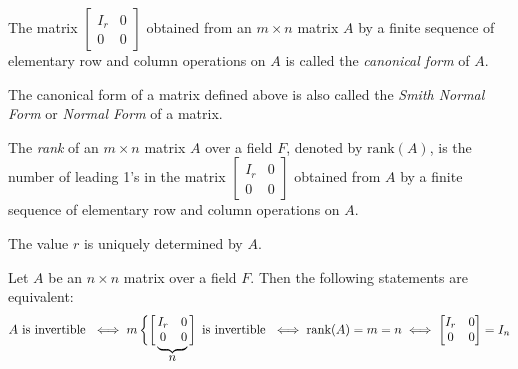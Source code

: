 \documentclass[
	11pt, %
	fleqn, %
	a4paper, %
]{LegrandOrangeBook}
\begin{document}
\begin{definition}
    The matrix $\begin{bmatrix}
        I_r & 0 \\
        0 & 0
    \end{bmatrix}$ obtained from an $m \times n$ matrix $A$ by a finite sequence of elementary row and column operations on $A$ is called the \emph{canonical form} of $A$.    
\end{definition}

\begin{remark}
    The canonical form of a matrix defined above is also called the \emph{Smith Normal Form} or \emph{Normal Form} of a matrix.
\end{remark}

\begin{definition}
    The \emph{rank} of an $m \times n$ matrix $A$ over a field $F$, denoted by $\text{rank}(A)$, is the number of leading 1's in the matrix $\begin{bmatrix}
        I_r & 0 \\
        0 & 0
    \end{bmatrix}$ obtained from $A$ by a finite sequence of elementary row and column operations on $A$.
\end{definition}

\begin{remark}
    The value $r$ is uniquely determined by $A$.
\end{remark}

\def\matriximg{%
    \begin{matrix}
        I_r & 0 \\
        0 & 0 
    \end{matrix}
}

\begin{proposition}
    Let $A$ be an $n \times n$ matrix over a field $F$. Then the following statements are equivalent:
    \[
        A \text{ is invertible } \iff m \left\{\left[\vphantom{\matriximg}\right.\right.\kern-2\nulldelimiterspace
        \underbrace{\matriximg}_{\text{\normalsize $n$}}\kern-\nulldelimiterspace\left.\vphantom{\matriximg}\right] \text{ is invertible } \iff \text{rank}(A) = m = n \iff \begin{bmatrix}
            I_r & 0 \\
            0 & 0
        \end{bmatrix} = I_n
    \]
\end{proposition}
\end{document}
